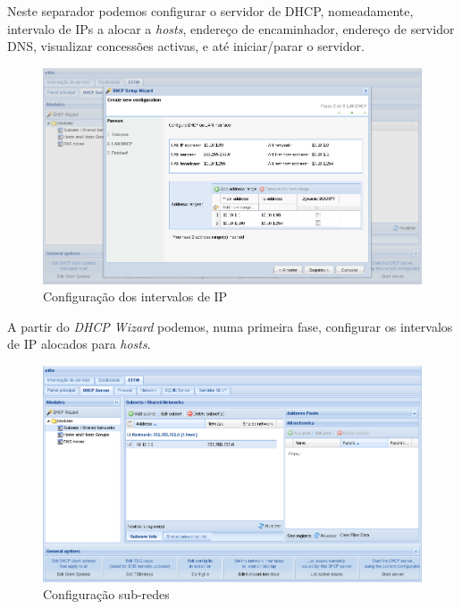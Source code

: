 Neste separador podemos configurar o servidor de DHCP, nomeadamente, intervalo de IPs a alocar a \textit{hosts}, endereço de encaminhador, endereço de servidor DNS, visualizar concessões activas, e até iniciar/parar o servidor.

\begin{figure}[H]
    \begin{center}
    \includegraphics[scale=0.38]{screenshots/etfw/etfw_dhcp_wizard_01.png}
    \caption{Configuração dos intervalos de IP}
    \label{fig:etfw_dhcp_wizard_01}
    \end{center}
\end{figure}

A partir do \textit{DHCP Wizard} podemos, numa primeira fase, configurar os intervalos de IP alocados para \textit{hosts}.

\begin{figure}[H]
    \begin{center}
    \includegraphics[scale=0.38]{screenshots/etfw/etfw_dhcp_subnets_01.png}
    \caption{Configuração sub-redes}
    \label{fig:etfw_dhcp_subnets_01}
    \end{center}
\end{figure}

